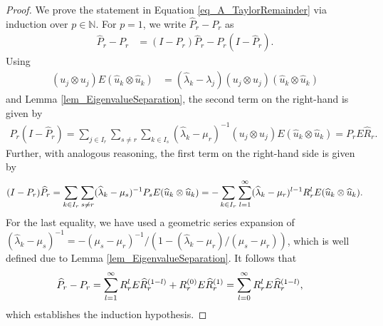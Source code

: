 \documentclass[a4paper,11pt]{article} %
\numberwithin{equation}{section}
\theoremstyle{definition}
\theoremstyle{remark}
\theoremstyle{plain}
\begin{document}
\begin{proof} %
  We prove the statement in Equation \eqref{eq_A_TaylorRemainder} via induction
  over \( p \in \mathbb{N} \).
  For \( p = 1 \), we write \( \widehat{P}_{r} - P_r \) as
  \begin{align}
        \widehat{P}_{r} - P_{r} 
    & = 
        ( I - P_{r} ) \widehat{P}_{r} - P_{r} ( I - \widehat{P}_{r} ).
  \end{align}
  Using \begin{align}
  \label{eq_ProjectureToEigenvalueEquality}
  ( u_{j} \otimes u_{j} ) E ( \widehat{u}_{k} \otimes \widehat{u}_{k} ) 
  & = 
  ( \widehat{ \lambda }_{k} - \lambda_{j} ) 
  ( u_{j} \otimes u_{j} ) ( \widehat{u}_{k} \otimes \widehat{u}_{k} ) 
\end{align}
  and Lemma \ref{lem_EigenvalueSeparation}, the second term on the right-hand is given by
  \begin{align}
      P_{r} ( I - \widehat{P}_{r} ) 
    = 
      \sum_{ j \in I_{r} } 
      \sum_{ s \ne r } \sum_{ k \in I_{s} }
      ( \widehat{ \lambda }_{k} - \mu_{r} )^{-1}
      ( u_{j} \otimes u_{j} ) E ( \widehat{u}_{k} \otimes \widehat{u}_{k} ) 
    = 
      P_{r} E \widehat{R}_{r}.
  \end{align}
  Further, with analogous reasoning, the first term on the right-hand side is 
  given by
  \begin{align}
      ( I - P_{r} ) \widehat{P}_{r} 
    =
      \sum_{ k \in I_{r} } 
      \sum_{ s \ne r } ( \widehat{ \lambda }_{k} - \mu_{s} )^{-1} P_{s}
      E ( \widehat{u}_{k} \otimes \widehat{u}_{k} ) 
    = 
      - \sum_{ k \in I_{r} } \sum_{ l = 1 }^{ \infty } 
      ( \widehat{ \lambda }_{k} - \mu_{r} )^{ l - 1 } 
      R_{r}^{l} E ( \widehat{u}_{k} \otimes \widehat{u}_{k} ). 
    \notag
  \end{align}
  For the last equality, we have used a geometric series expansion of
  \( 
      ( \widehat{ \lambda }_{k} - \mu_{s} )^{-1} 
    = 
      - ( \mu_{s} - \mu_{r} )^{-1} / 
        ( 1 - ( \widehat{ \lambda }_{k} - \mu_{r} ) / ( \mu_{s} - \mu_{r} ) )
  \),
  which is well defined due to Lemma \ref{lem_EigenvalueSeparation}.
  It follows that 
  \begin{align}
            \widehat{P}_{r} - P_{r} 
    & = 
            \sum_{ l = 1 }^{ \infty } 
            R_{r}^{l} E \widehat{R}_{r}^{ ( 1 - l ) }
          + 
            R_{r}^{ (0) } E \widehat{R}_{r}^{ (1) }
    = 
            \sum_{ l = 0 }^{ \infty } 
            R_{r}^{l} E \widehat{R}_{r}^{ ( 1 - l ) },
    \notag
  \end{align}
  which establishes the induction hypothesis.


\end{proof}
\end{document}
